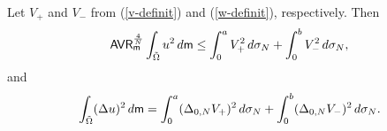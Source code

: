 \documentclass[10pt,a4paper]{amsart}
\begin{document}
		\begin{theorem} \label{talenti-result-thm}
			Let  $V_+$ and $V_-$ from {\rm (\ref{v-definit})} and {\rm (\ref{w-definit})}, respectively. Then
			\begin{equation}\label{u-v-w}
				{\sf AVR}_ {\sf m}^\frac{4}{N}	\int_{\tilde \Omega}u^2 \, {\rm d}{\sf m}\leq \int_{0}^aV_+^2 \, {\rm d}\sigma_N+\int_{0}^b V_-^2 \, {\rm d}\sigma_N,
			\end{equation}
			and
			\begin{equation}\label{laplace-hasonlitas}
				\int_{\tilde \Omega} (\Delta u)^2 \, {\rm d}{\sf m}=\int_{0}^a (\Delta_{0,N}V_+)^2 \, {\rm d}\sigma_N+ \int_{0}^b (\Delta_{0,N}V_-)^2 \, {\rm d}\sigma_N.
			\end{equation}
		\end{theorem}
\end{document}
